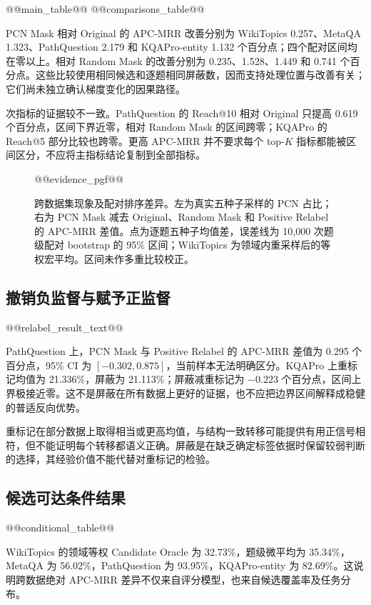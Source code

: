 \documentclass[UTF8,a4paper,10pt,fontset=fandol]{ctexart}
\begin{document}
@@main_table@@
@@comparisons_table@@

PCN Mask 相对 Original 的 APC-MRR 改善分别为 WikiTopics 0.257、MetaQA 1.323、PathQuestion 2.179 和 KQAPro-entity 1.132 个百分点；四个配对区间均在零以上。相对 Random Mask 的改善分别为 0.235、1.528、1.449 和 0.741 个百分点。这些比较使用相同候选和逐题相同屏蔽数，因而支持处理位置与改善有关；它们尚未独立确认梯度变化的因果路径。

次指标的证据较不一致。PathQuestion 的 Reach@10 相对 Original 只提高 0.619 个百分点，区间下界近零，相对 Random Mask 的区间跨零；KQAPro 的 Reach@5 部分比较也跨零。更高 APC-MRR 并不要求每个 top-$K$ 指标都能被区间区分，不应将主指标结论复制到全部指标。

\begin{figure}[tbp]\centering
\begin{lrbox}{\pcnfigurebox}
@@evidence_pgf@@
\end{lrbox}\resizebox{\linewidth}{!}{\usebox{\pcnfigurebox}}
\caption{跨数据集现象及配对排序差异。左为真实五种子采样的 PCN 占比；右为 PCN Mask 减去 Original、Random Mask 和 Positive Relabel 的 APC-MRR 差值。点为逐题五种子均值差，误差线为 10,000 次题级配对 bootstrap 的 95\% 区间；WikiTopics 为领域内重采样后的等权宏平均。区间未作多重比较校正。}\label{fig:evidence}
\end{figure}

\subsection{撤销负监督与赋予正监督}
@@relabel_result_text@@

PathQuestion 上，PCN Mask 与 Positive Relabel 的 APC-MRR 差值为 0.295 个百分点，95\% CI 为 $[-0.302,0.875]$，当前样本无法明确区分。KQAPro 上重标记均值为 21.336\%，屏蔽为 21.113\%；屏蔽减重标记为 $-0.223$ 个百分点，区间上界极接近零。这不是屏蔽在所有数据上更好的证据，也不应把边界区间解释成稳健的普适反向优势。

重标记在部分数据上取得相当或更高均值，与结构一致转移可能提供有用正信号相符，但不能证明每个转移都语义正确。屏蔽是在缺乏确定标签依据时保留较弱判断的选择，其经验价值不能代替对重标记的检验。

\subsection{候选可达条件结果}
@@conditional_table@@

WikiTopics 的领域等权 Candidate Oracle 为 32.73\%，题级微平均为 35.34\%，MetaQA 为 56.02\%，PathQuestion 为 93.95\%，KQAPro-entity 为 82.69\%。这说明跨数据绝对 APC-MRR 差异不仅来自评分模型，也来自候选覆盖率及任务分布。
\end{document}
